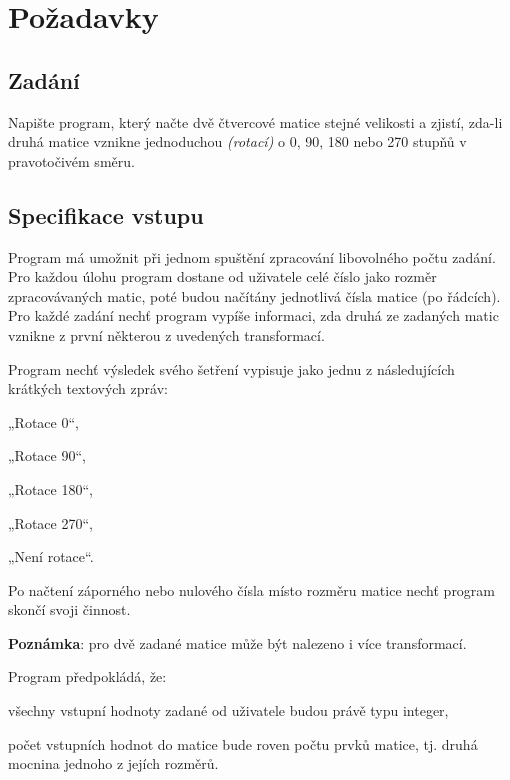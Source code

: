 \documentclass[a4paper,12pt]{article}
\newenvironment{itemize*}%
{\begin{itemize}%
     \setlength{\parskip}{0.25\baselineskip}%
     \setlength{\itemsep}{0pt}%
     \setlength{\partopsep}{0pt}%
     \setlength{\topsep}{0pt}}%
     {\end{itemize}}
\begin{document}

\section{Požadavky}
     \subsection{Zadání}
          Napište program, který načte dvě čtvercové matice stejné velikosti
          a zjistí, zda-li druhá matice vznikne jednoduchou \textit{(rotací)}
          o 0, 90, 180 nebo 270 stupňů v pravotočivém směru.
     \subsection{Specifikace vstupu}
          Program má umožnit při jednom spuštění zpracování libovolného počtu zadání. Pro každou úlohu program dostane od uživatele celé číslo jako rozměr
          zpracovávaných matic, poté budou načítány jednotlivá čísla matice (po řádcích). Pro každé zadání nechť program vypíše informaci, zda druhá ze zadaných matic vznikne
          z první některou z uvedených transformací.

          Program nechť výsledek svého šetření vypisuje jako jednu z následujících krátkých textových zpráv:
          \begin{itemize*}
               \item „Rotace 0“,
               \item „Rotace 90“,
               \item „Rotace 180“,
               \item „Rotace 270“,
               \item „Není rotace“.
          \end{itemize*}

          Po načtení záporného nebo nulového čísla místo rozměru matice nechť program skončí svoji činnost.

          \textbf{Poznámka}: pro dvě zadané matice může být nalezeno i více transformací.

          Program předpokládá, že:
          \begin{itemize*}
               \item všechny vstupní hodnoty zadané od uživatele budou právě typu integer,
               \item počet vstupních hodnot do matice bude roven počtu prvků matice, tj. druhá mocnina jednoho z jejích rozměrů.
          \end{itemize*}
\newpage
\end{document}
